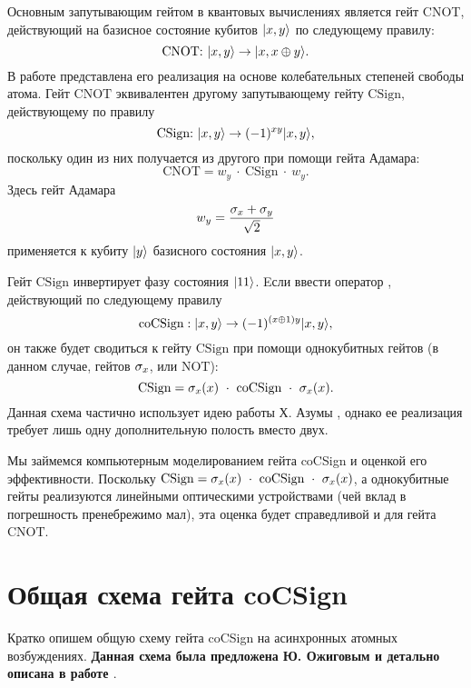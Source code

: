 Основным запутывающим гейтом в квантовых вычислениях является гейт CNOT, действующий на базисное состояние кубитов $|x, y\rangle$ по следующему правилу:
\[
\text{CNOT:}~|x, y\rangle \rightarrow |x, x \oplus y\rangle.
\]
В работе \cite{quantum_gates_monroe} представлена его реализация на основе колебательных степеней свободы атома. Гейт $\text{CNOT}$ эквивалентен другому запутывающему гейту $\text{CSign}$, действующему по правилу
\[
\text{CSign:}~|x, y\rangle \rightarrow (-1)^{xy}|x, y\rangle,
\]
поскольку один из них получается из другого при помощи гейта Адамара:
\[
\text{CNOT} = w_{y}~\cdot~\text{CSign}~\cdot~w_{y}.
\]
Здесь гейт Адамара 
\[
\displaystyle w_{y} = \frac{\sigma_{x} + \sigma_{y}}{\sqrt{2}}
\]
применяется к кубиту $|y\rangle$ базисного состояния $|x, y\rangle$.

Гейт $\text{CSign}$ инвертирует фазу состояния $|11\rangle$. Eсли ввести оператор , действующий по следующему правилу
\[
\text{coCSign}: |x, y\rangle \rightarrow (-1)^{(x \oplus 1)y}|x, y\rangle,
\]
он также будет сводиться к гейту $\text{CSign}$ при помощи однокубитных гейтов (в данном случае, гейтов $\sigma_{x}$, или $\text{NOT}$):
\[
\text{CSign} = \sigma_{x}(x)~\cdot~\text{coCSign}~\cdot~\sigma_{x}(x).
\]
\indent Данная схема частично использует идею работы Х. Азумы \cite{azuma}, однако ее реализация требует лишь одну дополнительную полость вместо двух.

Мы займемся компьютерным моделированием гейта coCSign и оценкой его эффективности. Поскольку $\text{CSign} = \sigma_{x}(x)~\cdot~\text{coCSign}~\cdot~\sigma_{x}(x)$, а однокубитные гейты реализуются линейными оптическими устройствами (чей вклад в погрешность пренебрежимо мал), эта оценка будет справедливой и для гейта $\text{CNOT}$.

\clearpage
\section{Общая схема гейта coCSign}\label{sec:ch5/sect2}

Кратко опишем общую схему гейта coCSign на асинхронных атомных возбуждениях. \textbf{Данная схема была предложена Ю. Ожиговым и детально описана в работе \cite{quantum_gates_asynchronous}}.

